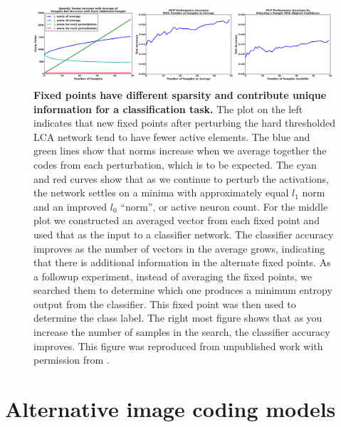 \begin{figure}[h]
    \centering
    \includegraphics[width=\textwidth]{figures/lca_norms_acc.png}
    \caption{\textbf{Fixed points have different sparsity and contribute unique information for a classification task.} The plot on the left indicates that new fixed points after perturbing the hard thresholded LCA network tend to have fewer active elements. The blue and green lines show that norms increase when we average together the codes from each perturbation, which is to be expected. The cyan and red curves show that as we continue to perturb the activations, the network settles on a minima with approximately equal $l_{1}$ norm and an improved $l_{0}$ ``norm'', or active neuron count. For the middle plot we constructed an averaged vector from each fixed point and used that as the input to a classifier network. The classifier accuracy improves as the number of vectors in the average grows, indicating that there is additional information in the alternate fixed points. As a followup experiment, instead of averaging the fixed points, we searched them to determine which one produces a minimum entropy output from the classifier. This fixed point was then used to determine the class label. The right most figure shows that as you increase the number of samples in the search, the classifier accuracy improves. This figure was reproduced from unpublished work with permission from \parencite{shainin2016sampling}.}
    \label{fig:ch2_lca_norms_and_acc}
\end{figure}


\section{Alternative image coding models}\label{sec:ch2_alternative_image_coding_models}

%
%


